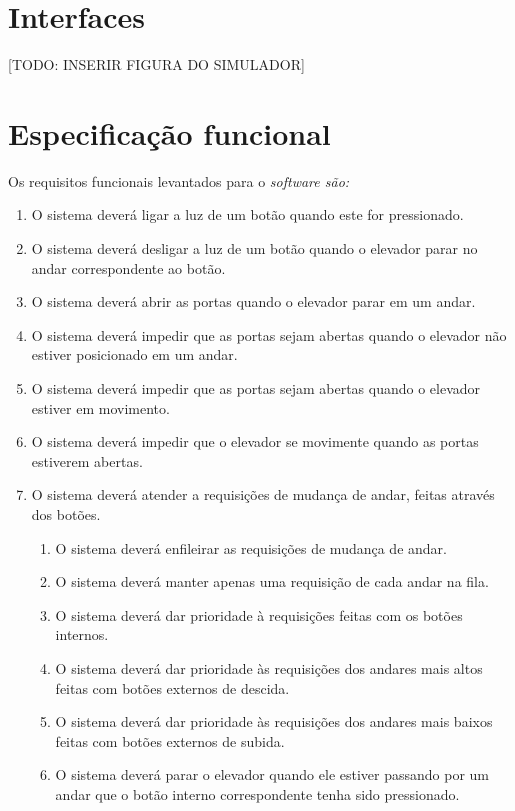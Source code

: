 \section{Interfaces}
[TODO: INSERIR FIGURA DO SIMULADOR]


\section{Especificação funcional}



Os requisitos funcionais levantados para o \it{software} são:

\begin{enumerate}[label=RF \arabic*. , ref=\arabic*]
	\item O sistema deverá ligar a luz de um botão quando este for pressionado.
  \item O sistema deverá desligar a luz de um botão quando o elevador parar no andar correspondente ao botão.
  \item O sistema deverá abrir as portas quando o elevador parar em um andar.
  \item O sistema deverá impedir que as portas sejam abertas quando o elevador não estiver posicionado em um andar.
  \item O sistema deverá impedir que as portas sejam abertas quando o elevador estiver em movimento.
  \item O sistema deverá impedir que o elevador se movimente quando as portas estiverem abertas.
  \item O sistema deverá atender a requisições de mudança de andar, feitas através dos botões.
  \begin{enumerate}[label*=\arabic*.]
    \item O sistema deverá enfileirar as requisições de mudança de andar.
    \item O sistema deverá manter apenas uma requisição de cada andar na fila.
    \item O sistema deverá dar prioridade à requisições feitas com os botões internos.
    \item O sistema deverá dar prioridade às requisições dos andares mais altos feitas com botões externos de descida.
    \item O sistema deverá dar prioridade às requisições dos andares mais baixos feitas com botões externos de subida.
    \item O sistema deverá parar o elevador quando ele estiver passando por um andar que o botão interno correspondente tenha sido pressionado.

\end{enumerate}
\end{enumerate}
